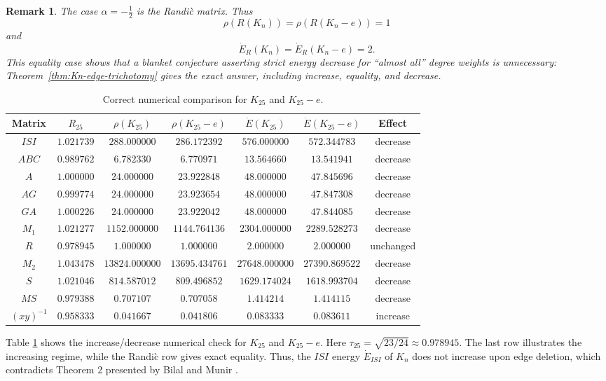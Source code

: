\documentclass[12pt,twoside]{article}
\newtheorem{remark}[theorem]{Remark}
\begin{document}
\begin{remark}
	The case $\alpha=-\tfrac12$ is the Randi\`c matrix. Thus
	$$
	\rho(R(K_n))=\rho(R(K_n-e))=1
	$$
	and
	$$
	\dot E_R(K_n)=\dot E_R(K_n-e)=2.
	$$
	This equality case shows that a blanket conjecture asserting strict energy decrease for ``almost all'' degree weights is unnecessary: Theorem~\ref{thm:Kn-edge-trichotomy} gives the exact answer, including increase, equality, and decrease.
\end{remark}

\begin{table}[H]
	\centering 
	\setlength{\tabcolsep}{3.5pt}
	\begin{tabular}{|c|c|c|c|c|c|c|}
		\hline
		Matrix & $R_{25}$ & $\rho(K_{25})$ & $\rho(K_{25}-e)$ & $\dot E(K_{25})$ & $\dot E(K_{25}-e)$ & Effect\\
		\hline
		$ISI$ & $1.021739$ & $288.000000$ & $286.172392$ & $576.000000$ & $572.344783$ & decrease\\
		\hline
		$ABC$ & $0.989762$ & $6.782330$ & $6.770971$ & $13.564660$ & $13.541941$ & decrease\\
		\hline
		$A$ & $1.000000$ & $24.000000$ & $23.922848$ & $48.000000$ & $47.845696$ & decrease\\
		\hline
		$AG$ & $0.999774$ & $24.000000$ & $23.923654$ & $48.000000$ & $47.847308$ & decrease\\
		\hline
		$GA$ & $1.000226$ & $24.000000$ & $23.922042$ & $48.000000$ & $47.844085$ & decrease\\
		\hline
		$M_1$ & $1.021277$ & $1152.000000$ & $1144.764136$ & $2304.000000$ & $2289.528273$ & decrease\\
		\hline
		$R$ & $0.978945$ & $1.000000$ & $1.000000$ & $2.000000$ & $2.000000$ & unchanged\\
		\hline
		$M_2$ & $1.043478$ & $13824.000000$ & $13695.434761$ & $27648.000000$ & $27390.869522$ & decrease\\
		\hline
		$S$ & $1.021046$ & $814.587012$ & $809.496852$ & $1629.174024$ & $1618.993704$ & decrease\\
		\hline
		$MS$ & $0.979388$ & $0.707107$ & $0.707058$ & $1.414214$ & $1.414115$ & decrease\\
		\hline
		$(xy)^{-1}$ & $0.958333$ & $0.041667$ & $0.041806$ & $0.083333$ & $0.083611$ & increase\\
		\hline
	\end{tabular}
	\caption{Correct numerical comparison for $K_{25}$ and $K_{25}-e$.}
	\label{tab:Kn-corrected-numerics}
\end{table}
Table \ref{tab:Kn-corrected-numerics} shows the increase/decrease numerical check for $K_{25}$ and $K_{25}-e$. Here $\tau_{25}=\sqrt{23/24}\approx0.978945$. The last row illustrates the increasing regime, while the Randi\`c row gives exact equality.
Thus, the $ISI$ energy $\dot{E}_{ISI}$ of $K_{n}$ does not increase upon edge deletion, which contradicts Theorem 2 presented by Bilal and Munir \cite{bilalpak}.
\end{document}
